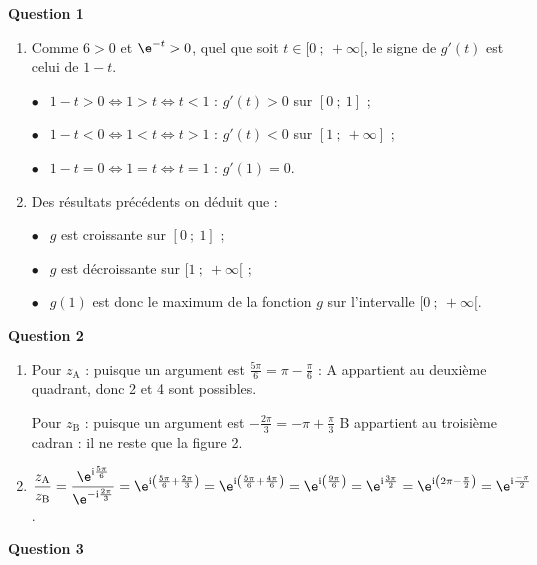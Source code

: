 \medskip

\textbf{Question 1}

\medskip

\begin{enumerate}
\item Comme $6 > 0$ et $\e^{-t} > 0$, quel que soit $t \in [0~;~+ \infty[$, le signe de $g'(t)$ est celui de $1 - t$.

$\bullet~~$ $1 - t > 0 \iff 1 > t \iff t < 1$ : $g'(t) > 0$ sur $[0~;~1]$ ;

$\bullet~~$ $1 - t < 0 \iff 1 < t \iff t > 1$ : $g'(t) < 0$ sur $[1~;~+ \infty]$ ;

$\bullet~~$ $1 - t = 0 \iff 1 = t \iff t = 1$ : $g'(1) = 0$.

\item Des résultats précédents on déduit que :

$\bullet~~$ $g$ est croissante sur $[0~;~1]$ ;

$\bullet~~$ $g$ est décroissante sur $[1~;~+ \infty[$ ;

$\bullet~~$ $g(1)$ est donc le maximum de la fonction $g$ sur l'intervalle $[0~;~+ \infty[$.
\end{enumerate}

\bigskip

\textbf{Question 2}

\medskip

\begin{enumerate}
\item Pour $z_{\text{A}}$ : puisque un argument est $\frac{5\pi}{6} = \pi - \frac{\pi}{6}$ : A appartient au deuxième quadrant, donc 2 et 4 sont possibles.

Pour $z_{\text{B}}$ : puisque un argument est $-\frac{2\pi}{3} = - \pi + \frac{\pi}{3}$ B appartient au troisième cadran : il ne reste que la figure 2. 

\item $\dfrac{z_{\text A}}{z_{\text B}} = \dfrac{\e^{\text{i} \frac{5\pi}{6}}}{\e^{-\text{i} \frac{2\pi}{3}}} = \e^{\text{i} \left(\frac{5\pi}{6} + \frac{2\pi}{3}\right)} = \e^{\text{i} \left(\frac{5\pi}{6} + \frac{4\pi}{6}\right)} = \e^{\text{i} \left(\frac{9\pi}{6}\right)} = \e^{\text{i} \frac{3\pi}{2}} = \e^{\text{i} \left(2\pi - \frac{\pi}{2}\right)}  = \e^{\text{i} \frac{-\pi}{2}}$.
\end{enumerate}

\bigskip

\textbf{Question 3}

\medskip

